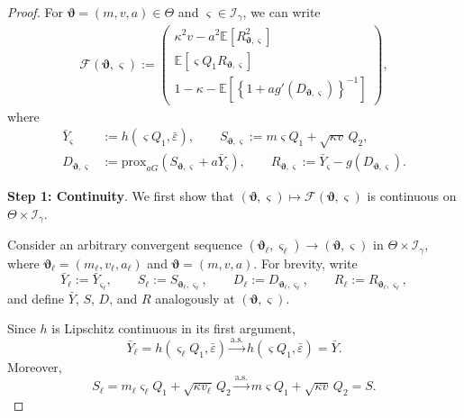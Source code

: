\documentclass[12pt,reqno]{amsart}
\newcommand{\prox}{\mathrm{prox}}
\newcommand{\as}{\overset{\mathrm{a.s.}}{\longrightarrow}}
\begin{document}
{\begin{proof}
For $\bm\vartheta=(m,v,a)\in\Theta$ and $\varsigma\in\mathcal I_\gamma$, we can write
\begin{align}
\mathcal F(\bm\vartheta,\varsigma)
:=
\begin{pmatrix}
\kappa^2v
-
a^2\mathbb{E}\left[
R_{\bm\vartheta,\varsigma}^2
\right]
\\[1mm]
\mathbb{E}\left[
\varsigma Q_1R_{\bm\vartheta,\varsigma}
\right]
\\[1mm]
1-\kappa
-
\mathbb{E}\left[
\left\{
1+a g'(D_{\bm\vartheta,\varsigma})
\right\}^{-1}
\right]
\end{pmatrix},
\label{eq:SE-residual-map}
\end{align}
where
\begin{align}
\bar Y_{\varsigma}
&:=
h(\varsigma Q_1,\bar\varepsilon),
\qquad S_{\bm\vartheta,\varsigma}
:=
m\varsigma Q_1+\sqrt{\kappa v}\,Q_2,
\label{eq:SE-linear-varsigma}\\
D_{\bm\vartheta,\varsigma}
&:=
{\prox}_{aG}
\left(
S_{\bm\vartheta,\varsigma}
+a\bar Y_{\varsigma}
\right),
\qquad R_{\bm\vartheta,\varsigma}
:=
\bar Y_{\varsigma}
-
g(D_{\bm\vartheta,\varsigma}).
\label{eq:SE-residual-varsigma}
\end{align}

\textbf{Step 1: Continuity}.
We first show that $(\bm\vartheta,\varsigma)
\mapsto
\mathcal F(\bm\vartheta,\varsigma)$
is continuous on
$\Theta\times\mathcal I_\gamma$.

Consider an arbitrary convergent sequence $(\bm\vartheta_\ell,\varsigma_\ell)
\rightarrow
(\bm\vartheta,\varsigma)$ in $\Theta\times\mathcal I_\gamma,$
where $\bm\vartheta_\ell=(m_\ell,v_\ell,a_\ell)$ and $\bm\vartheta=(m,v,a).$
For brevity, write
\[
\bar Y_\ell
:=
\bar Y_{\varsigma_\ell},
\qquad
S_\ell
:=
S_{\bm\vartheta_\ell,\varsigma_\ell},
\qquad
D_\ell
:=
D_{\bm\vartheta_\ell,\varsigma_\ell},
\qquad
R_\ell
:=
R_{\bm\vartheta_\ell,\varsigma_\ell},
\]
and define
$\bar Y$, $S$, $D$, and $R$ analogously at
$(\bm\vartheta,\varsigma)$.

Since $h$ is Lipschitz continuous in its first argument,
\[
\bar Y_\ell
=h(\varsigma_\ell Q_1,\bar\varepsilon)
\as
h(\varsigma Q_1,\bar\varepsilon)
=\bar Y.
\]
Moreover,
\[
S_\ell
=m_\ell\varsigma_\ell Q_1+\sqrt{\kappa v_\ell}\,Q_2
\as
m\varsigma Q_1+\sqrt{\kappa v}\,Q_2=
S.
\]


\end{proof}}
\end{document}
